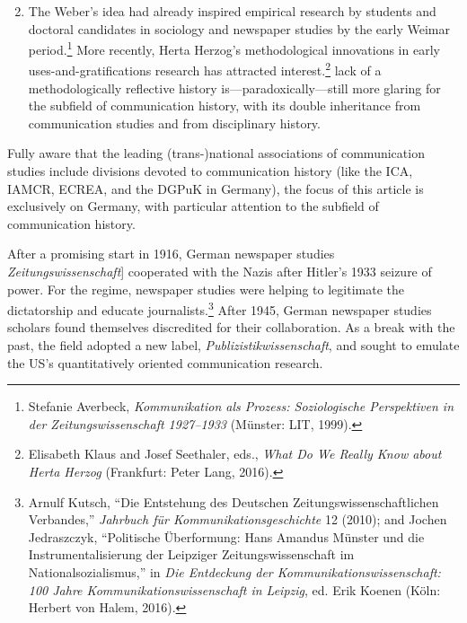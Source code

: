 \documentclass{tufte-handout}
\begin{document}
\begin{enumerate}

\setcounter{enumi}{1}

\item
  The Weber's idea had
  already inspired empirical research by students and doctoral
  candidates in sociology and newspaper studies by the early Weimar
  period.\footnote{Stefanie Averbeck, \emph{Kommunikation als Prozess:
    Soziologische Perspektiven in der Zeitungswissenschaft 1927--1933}
    (Münster: LIT, 1999).} More recently, Herta Herzog's methodological
  innovations in early uses-and-gratifications research has attracted
  interest.\footnote{Elisabeth Klaus and Josef Seethaler, eds.,
    \emph{What Do We Really Know about Herta Herzog} (Frankfurt: Peter
    Lang, 2016).} lack of a methodologically reflective history
  is---paradoxically---still more glaring for the subfield of
  communication history, with its double inheritance from communication
  studies and from disciplinary history.
\end{enumerate}

Fully aware that the leading (trans-)national associations of
communication studies include divisions devoted to communication history
(like the ICA, IAMCR, ECREA, and the DGPuK in Germany), the focus of
this article is exclusively on Germany, with particular attention to the
subfield of communication history.

After a promising start in 1916, German newspaper studies
\\\noindent {[}\emph{Zeitungswissenschaft}{]} cooperated with the Nazis after
Hitler's 1933 seizure of power. For the regime, newspaper studies were
helping to legitimate the dictatorship and educate
journalists.\footnote{Arnulf Kutsch, ``Die Entstehung des Deutschen
  Zeitungswissenschaftlichen Verbandes,'' \emph{Jahrbuch für
  Kommunikationsgeschichte} 12 (2010); and Jochen Jedraszczyk,
  ``Politische Überformung: Hans Amandus Münster und die
  Instrumentalisierung der Leipziger Zeitungswissenschaft im
  Nationalsozialismus,'' in \emph{Die Entdeckung der
  Kommunikationswissenschaft: 100 Jahre Kommunikationswissenschaft in
  Leipzig}, ed. Erik Koenen (Köln: Herbert von Halem, 2016).} After
1945, German newspaper studies scholars found themselves discredited for
their collaboration. As a break with the past, the field adopted a new
label, \emph{Publizistikwissenschaft}, and sought to emulate the US's
quantitatively oriented communication research.
\end{document}
